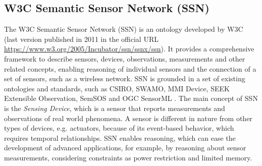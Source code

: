 \documentclass{sig-alternate-05-2015}
\begin{document}
\subsection{W3C Semantic Sensor Network (SSN)}
The W3C Semantic Sensor Network (SSN) \cite{Compton2012} is an ontology developed by W3C (last version published in 2011 in the official URL \url{https://www.w3.org/2005/Incubator/ssn/ssnx/ssn}). It provides a comprehensive framework to describe sensors, devices, observations, measurements and other related concepts, enabling reasoning of individual sensors and the connection of a set of sensors, such as a wireless network. SSN is grounded in a set of existing ontologies and standards, such as CSIRO, SWAMO, MMI Device, SEEK Extensible Observation, SemSOS and OGC SensorML \cite{Ganzha2016a}. The main concept of SSN is the \textit{Sensing Device}, which is a sensor that reports measurements and observations of real world phenomena. A sensor is different in nature from other types of devices, e.g. actuators, because of its event-based behavior, which requires temporal relationships. SSN enables reasoning, which can ease the development of advanced applications, for example, by reasoning about sensor measurements, considering constraints as power restriction and limited memory. 
\end{document}
